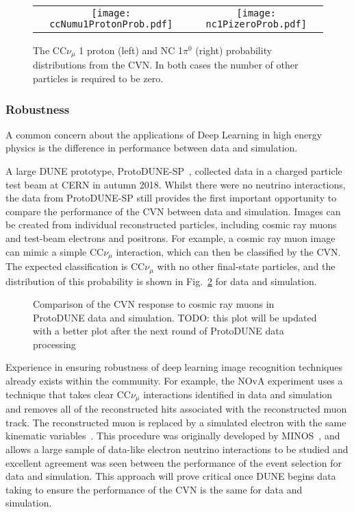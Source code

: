\begin{figure}
    \centering
    \begin{tabular}{cc}
		\texttt{[image: ccNumu1ProtonProb.pdf]} &
		\texttt{[image: nc1PizeroProb.pdf]}
	\end{tabular}
	\caption{The CC$\nu_\mu$ 1 proton (left) and NC 1$\pi^0$ (right) probability distributions from the CVN. In both cases the number of other particles is required to be zero.}
    \label{fig:exclusive}
\end{figure}

\subsubsection{Robustness}
A common concern about the applications of Deep Learning in high energy physics is the difference in performance between data and simulation. 

A large DUNE prototype, ProtoDUNE-SP~\cite{Abi:2017aow}, collected data in a charged particle test beam at CERN in autumn 2018. Whilst there were no neutrino interactions, the data from ProtoDUNE-SP still provides the first important opportunity to compare the performance of the CVN between data and simulation. Images can be created from individual reconstructed particles, including cosmic ray muons and test-beam electrons and positrons. For example, a cosmic ray muon image
can mimic a simple CC$\nu_\mu$ interaction, which can then be classified by the CVN. The expected classification is CC$\nu_\mu$ with no other final-state particles, and the distribution of this probability is shown in Fig.~\ref{fig:protodunecvn} for data and simulation.

\begin{figure}
    \centering
    \caption{Comparison of the CVN response to cosmic ray muons in ProtoDUNE data and simulation. TODO: this plot will be updated with a better plot after the next round of ProtoDUNE data processing}
    \label{fig:protodunecvn}
\end{figure}

Experience in ensuring robustness of deep learning image recognition techniques already exists within the community. For example, the NOvA experiment uses a technique that takes clear CC$\nu_\mu$ interactions identified in data and simulation and removes all of the reconstructed hits associated with the reconstructed muon track. The reconstructed muon is replaced by a simulated electron with the same kinematic variables~\cite{NOvA_MRE}. This procedure was originally developed by MINOS~\cite{MINOS_MRE}, and allows a large sample of data-like electron neutrino interactions to be studied and excellent agreement was seen between the performance of the event selection for data and simulation. This approach will prove critical once DUNE begins data taking to ensure the performance of the CVN is the same for data and simulation.
